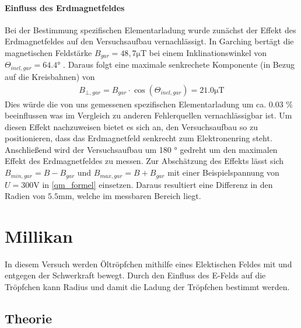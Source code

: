 \documentclass[11pt, a4paper]{article}
\begin{document}
        

    \paragraph{Einfluss des Erdmagnetfeldes}
        Bei der Bestimmung spezifischen Elementarladung wurde zunächst der Effekt des Erdmagnetfeldes auf den Versuchsaufbau
        vernachlässigt. In Garching bertägt die magnetischen Feldstärke $B_{gar} = 48,7 \si{\micro\tesla}$ \cite[]{magnetic_field} bei einem Inklinationswinkel von $\Theta_{incl,gar} = 64.4\si{\degree}$ \cite[]{magnetic_field}. 
        Daraus folgt eine maximale senkrechete Komponente (in Bezug auf die Kreisbahnen) von 
        \begin{align}
        B_{\bot,gar} = B_{gar} \cdot \cos (\Theta_{incl,gar}) = 21.0 \si{\micro\tesla}
        \end{align}
        Dies würde die von uns gemessenen spezifischen Elementarladung um ca. 0.03 \% beeinflussen was im Vergleich zu anderen
        Fehlerquellen vernachlässigbar ist. 
        Um diesen Effekt nachzuweisen bietet es sich an, den Versuchsaufbau so zu positionieren, dass das Erdmagnetfeld senkrecht zum Elektronenring steht.
        Anschließend wird der Versuchsaufbau um 180 \si{\degree} gedreht um den maximalen Effekt des Erdmagnetfeldes zu messen.
        Zur Abschätzung des Effekts lässt sich $B_{min,gar} = B - B_{gar}$ und $B_{max,gar} = B + B_{gar}$ mit einer Beispielspannung von $ U = 300 \si{\volt}$ in \ref{qm_formel} einsetzen.
        Daraus resultiert eine Differenz in den Radien von $5.5 \si{\milli\metre}$, welche im messbaren Bereich liegt.

    

    \section{Millikan}

    In diesem Versuch werden Öltröpfchen mithilfe eines Elektischen Feldes mit und entgegen der Schwerkraft bewegt. Durch den Einfluss des E-Felds auf die Tröpfchen kann Radius und damit die Ladung der Tröpfchen bestimmt werden.

    \subsection{Theorie}
\end{document}
